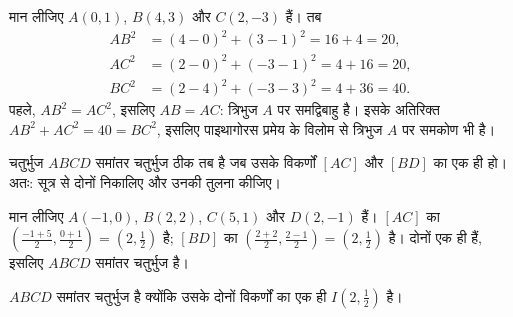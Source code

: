 \begin{example}\label{ex:g10:coordgeom:triangle}
मान लीजिए $A(0, 1)$, $B(4, 3)$ और $C(2, -3)$ हैं। तब
\begin{align*}
AB^2 &= (4-0)^2 + (3-1)^2 = 16 + 4 = 20, \\
AC^2 &= (2-0)^2 + (-3-1)^2 = 4 + 16 = 20, \\
BC^2 &= (2-4)^2 + (-3-3)^2 = 4 + 36 = 40 .
\end{align*}
पहले, $AB^2 = AC^2$, इसलिए $AB = AC$: त्रिभुज $A$ पर समद्विबाहु है। इसके अतिरिक्त $AB^2 + AC^2 = 40 = BC^2$,
इसलिए पाइथागोरस प्रमेय के विलोम से त्रिभुज $A$ पर समकोण भी है।
\end{example}

\begin{method}[समांतर चतुर्भुज पहचानना]\label{met:g10:coordgeom:parallelogram}
चतुर्भुज $ABCD$ समांतर चतुर्भुज ठीक तब है जब उसके विकर्णों $[AC]$ और $[BD]$ का
 एक ही हो। अतः:  सूत्र से दोनों  निकालिए और
उनकी तुलना कीजिए।
\end{method}

\begin{example}\label{ex:g10:coordgeom:parallelogram}
मान लीजिए $A(-1, 0)$, $B(2, 2)$, $C(5, 1)$ और $D(2, -1)$ हैं। $[AC]$ का  $\left(\frac{-1+5}{2}, \frac{0+1}{2}\right) = (2, \frac12)$ है; $[BD]$
का  $\left(\frac{2+2}{2}, \frac{2-1}{2}\right) =
(2, \frac12)$ है। दोनों एक ही हैं, इसलिए $ABCD$ समांतर चतुर्भुज है।
\end{example}

\begin{omfigure}

{\small $ABCD$ समांतर चतुर्भुज है क्योंकि उसके दोनों विकर्णों का 
एक ही $I(2, \frac12)$ है।}
\end{omfigure}

